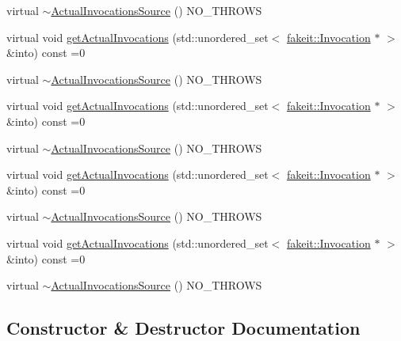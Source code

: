 \begin{DoxyCompactItemize}
\item 
virtual \mbox{\hyperlink{structfakeit_1_1ActualInvocationsSource_a2c5f7927a0a1ce519d1e96a4d802568e}{$\sim$\+Actual\+Invocations\+Source}} () N\+O\+\_\+\+T\+H\+R\+O\+WS
\item 
virtual void \mbox{\hyperlink{structfakeit_1_1ActualInvocationsSource_a274de522e11e1f9b8d70c6e0be9e5a9b}{get\+Actual\+Invocations}} (std\+::unordered\+\_\+set$<$ \mbox{\hyperlink{structfakeit_1_1Invocation}{fakeit\+::\+Invocation}} $\ast$ $>$ \&into) const =0
\item 
virtual \mbox{\hyperlink{structfakeit_1_1ActualInvocationsSource_a2c5f7927a0a1ce519d1e96a4d802568e}{$\sim$\+Actual\+Invocations\+Source}} () N\+O\+\_\+\+T\+H\+R\+O\+WS
\item 
virtual void \mbox{\hyperlink{structfakeit_1_1ActualInvocationsSource_a274de522e11e1f9b8d70c6e0be9e5a9b}{get\+Actual\+Invocations}} (std\+::unordered\+\_\+set$<$ \mbox{\hyperlink{structfakeit_1_1Invocation}{fakeit\+::\+Invocation}} $\ast$ $>$ \&into) const =0
\item 
virtual \mbox{\hyperlink{structfakeit_1_1ActualInvocationsSource_a2c5f7927a0a1ce519d1e96a4d802568e}{$\sim$\+Actual\+Invocations\+Source}} () N\+O\+\_\+\+T\+H\+R\+O\+WS
\item 
virtual void \mbox{\hyperlink{structfakeit_1_1ActualInvocationsSource_a274de522e11e1f9b8d70c6e0be9e5a9b}{get\+Actual\+Invocations}} (std\+::unordered\+\_\+set$<$ \mbox{\hyperlink{structfakeit_1_1Invocation}{fakeit\+::\+Invocation}} $\ast$ $>$ \&into) const =0
\item 
virtual \mbox{\hyperlink{structfakeit_1_1ActualInvocationsSource_a2c5f7927a0a1ce519d1e96a4d802568e}{$\sim$\+Actual\+Invocations\+Source}} () N\+O\+\_\+\+T\+H\+R\+O\+WS
\item 
virtual void \mbox{\hyperlink{structfakeit_1_1ActualInvocationsSource_a274de522e11e1f9b8d70c6e0be9e5a9b}{get\+Actual\+Invocations}} (std\+::unordered\+\_\+set$<$ \mbox{\hyperlink{structfakeit_1_1Invocation}{fakeit\+::\+Invocation}} $\ast$ $>$ \&into) const =0
\item 
virtual \mbox{\hyperlink{structfakeit_1_1ActualInvocationsSource_a2c5f7927a0a1ce519d1e96a4d802568e}{$\sim$\+Actual\+Invocations\+Source}} () N\+O\+\_\+\+T\+H\+R\+O\+WS
\end{DoxyCompactItemize}


\subsection{Constructor \& Destructor Documentation}
\mbox{\label{structfakeit_1_1ActualInvocationsSource_a2c5f7927a0a1ce519d1e96a4d802568e}} 

